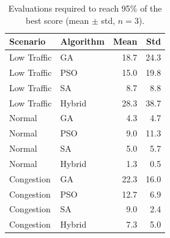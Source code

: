 \begin{table}[H]
\centering
\caption{Evaluations required to reach 95\% of the best score (mean $\pm$ std, $n=3$).}
\label{tab:evals95}
\begin{tabular}{llrr}
\toprule
\textbf{Scenario} & \textbf{Algorithm} & \textbf{Mean} & \textbf{Std} \\
\midrule
Low Traffic  & GA     & 18.7 & 24.3 \\
Low Traffic  & PSO    & 15.0 & 19.8 \\
Low Traffic  & SA     & 8.7  & 8.8 \\
Low Traffic  & Hybrid & 28.3 & 38.7 \\
\midrule
Normal       & GA     & 4.3  & 4.7 \\
Normal       & PSO    & 9.0  & 11.3 \\
Normal       & SA     & 5.0  & 5.7 \\
Normal       & Hybrid & 1.3  & 0.5 \\
\midrule
Congestion   & GA     & 22.3 & 16.0 \\
Congestion   & PSO    & 12.7 & 6.9 \\
Congestion   & SA     & 9.0  & 2.4 \\
Congestion   & Hybrid & 7.3  & 5.0 \\
\bottomrule
\end{tabular}
\end{table}


